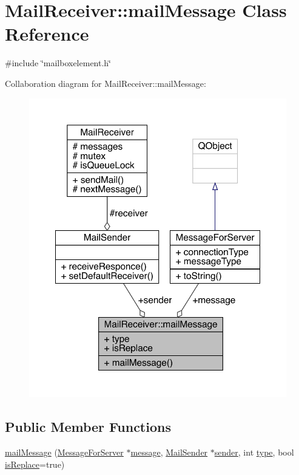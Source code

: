 \hypertarget{a00201}{}\section{Mail\+Receiver\+:\+:mail\+Message Class Reference}
\label{a00201}


{\ttfamily \#include \char`\"{}mailboxelement.\+h\char`\"{}}



Collaboration diagram for Mail\+Receiver\+:\+:mail\+Message\+:
\nopagebreak
\begin{figure}[H]
\begin{center}
\leavevmode
\includegraphics[width=350pt]{d8/d72/a00199}
\end{center}
\end{figure}
\subsection*{Public Member Functions}
\begin{DoxyCompactItemize}
\item 
\hyperlink{a00201_a0eaa6fb90637fea832337d73b9a83d4d}{mail\+Message} (\hyperlink{a00121}{Message\+For\+Server} $\ast$\hyperlink{a00201_aa5878557546468fcfb65e099a5d4bf7d}{message}, \hyperlink{a00205}{Mail\+Sender} $\ast$\hyperlink{a00201_a048079ebd149bb973368fd5bedb528a7}{sender}, int \hyperlink{a00201_ad301da15808225e62d84fd5e3cf33a1f}{type}, bool \hyperlink{a00201_afb7ab5377a6aa4a1e3d836d3e464a952}{is\+Replace}=true)
\end{DoxyCompactItemize}
